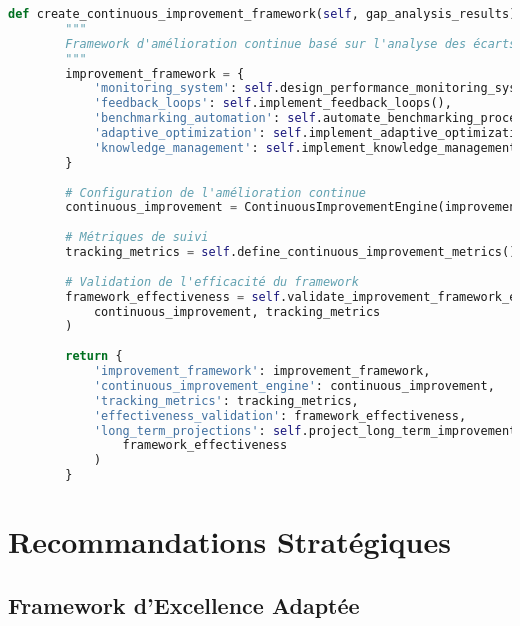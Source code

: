 \begin{lstlisting}[language=Python, caption=Analyseur d'écarts et d'opportunités]
    def create_continuous_improvement_framework(self, gap_analysis_results):
        """
        Framework d'amélioration continue basé sur l'analyse des écarts
        """
        improvement_framework = {
            'monitoring_system': self.design_performance_monitoring_system(),
            'feedback_loops': self.implement_feedback_loops(),
            'benchmarking_automation': self.automate_benchmarking_processes(),
            'adaptive_optimization': self.implement_adaptive_optimization(),
            'knowledge_management': self.implement_knowledge_management_system()
        }
        
        # Configuration de l'amélioration continue
        continuous_improvement = ContinuousImprovementEngine(improvement_framework)
        
        # Métriques de suivi
        tracking_metrics = self.define_continuous_improvement_metrics()
        
        # Validation de l'efficacité du framework
        framework_effectiveness = self.validate_improvement_framework_effectiveness(
            continuous_improvement, tracking_metrics
        )
        
        return {
            'improvement_framework': improvement_framework,
            'continuous_improvement_engine': continuous_improvement,
            'tracking_metrics': tracking_metrics,
            'effectiveness_validation': framework_effectiveness,
            'long_term_projections': self.project_long_term_improvements(
                framework_effectiveness
            )
        }
\end{lstlisting}

\section{Recommandations Stratégiques}

\subsection{Framework d'Excellence Adaptée}

